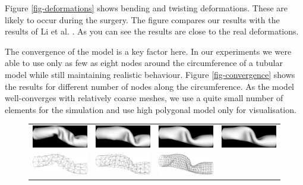 Figure \ref{fig-deformations} shows bending and twisting deformations.
These are likely to occur during the surgery.
The figure compares our
results with the results of Li et al. \cite{Li2009}. As you can see the
results are close to the real deformations.

The convergence of the model is a key factor here. In our
experiments we were able to use only as few as eight nodes around the
circumference of a tubular model while still maintaining realistic
behaviour. Figure \ref{fig-convergence} shows the results for different
number of nodes along the circumference.
As the model well-converges with relatively coarse meshes, we use 
a quite small number of elements for the simulation and use high polygonal model only for
visualisation. 

\begin{figure}[tbh]
  \centering
  \begin{tabular}{cccc}
    \includegraphics[width=0.24\columnwidth]{img/twist-06-cg.png}
    &
    \includegraphics[width=0.24\columnwidth]{img/twist-08-cg.png}
    &
    \includegraphics[width=0.24\columnwidth]{img/twist-16-cg.png}
    &
    \includegraphics[width=0.24\columnwidth]{img/twist-31-cg.png}
    \\
    \includegraphics[width=0.24\columnwidth]{img/twist-06w-cg.png}
    &
    \includegraphics[width=0.24\columnwidth]{img/twist-08w-cg.png}
    &
    \includegraphics[width=0.24\columnwidth]{img/twist-16w-cg.png}

\end{tabular}
\end{figure}
